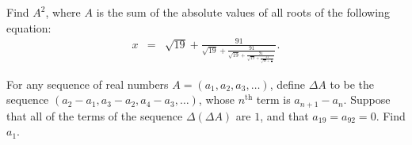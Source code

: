 \begin{question}[name={1991 AIME, \href{https://artofproblemsolving.com/community/c4p410088}{Problem 7}}]
	Find $A^2$, where $A$ is the sum of the absolute values of all roots of the following equation:
	\begin{eqnarray*}
		x &=& \sqrt{19} + \frac{91}{{\displaystyle \sqrt{19}+\frac{91}{{\displaystyle \sqrt{19}+\frac{91}{{\displaystyle \sqrt{19}+\frac{91}{{\displaystyle \sqrt{19}+\frac{91}{x}}}}}}}}}.
	\end{eqnarray*}
\end{question}
%
%
%	












\begin{question}[name={1992 AIME, \href{https://artofproblemsolving.com/community/c4p430070}{Problem 8}}]
	For any sequence of real numbers $A=(a_1,a_2,a_3,\ldots)$, define $\Delta A$ to be the sequence $(a_2-a_1,a_3-a_2,a_4-a_3,\ldots)$, whose $n^\text{th}$ term is $a_{n+1}-a_n$. Suppose that all of the terms of the sequence $\Delta(\Delta A)$ are $1$, and that $a_{19}=a_{92}=0$. Find $a_1$.
\end{question}



